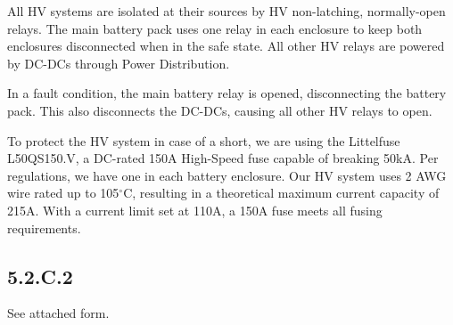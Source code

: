 \documentclass[10pt]{article}
\begin{document}
All HV systems are isolated at their sources by HV non-latching, normally-open relays. The main battery pack uses one relay in each enclosure to keep both enclosures disconnected when in the safe state. All other HV relays are powered by DC-DCs through Power Distribution.

In a fault condition, the main battery relay is opened, disconnecting the battery pack. This also disconnects the DC-DCs, causing all other HV relays to open.

To protect the HV system in case of a short, we are using the Littelfuse L50QS150.V, a DC-rated 150A High-Speed fuse capable of breaking 50kA. Per regulations, we have one in each battery enclosure. Our HV system uses 2 AWG wire rated up to 105$^{\circ}$C, resulting in a theoretical maximum current capacity of 215A. With a current limit set at 110A, a 150A fuse meets all fusing requirements.



\subsection{5.2.C.2}

See attached form.




\pagebreak
\appendix
\end{document}
